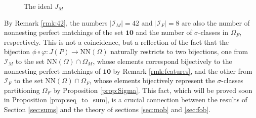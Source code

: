 \documentclass[10pt,a4paper]{amsart}
\numberwithin{equation}{section}
\newcommand{\ra}{\rightarrow}
\newcommand{\cali}{\mathcal{I}}
\newcommand{\ten}{\mathbf{10}}
\newcommand{\ob}{\Omega}
\newcommand{\fob}{\Omega_F}
\newcommand{\mob}{\Omega_M}
\newcommand{\nn}{\mathrm{NN}}
\newcommand{\abs}[1]{\lvert #1 \rvert}
\begin{document}
\begin{figure}[h!]
    \caption{The ideal $J_M$}
    \label{fig:a4}
\end{figure}

By Remark \ref{rmk:42}, the numbers $\abs{\cali_M}=42$ and $\abs{\cali_F}=8$ are
also the number of nonnesting perfect matchings of the set $\ten$ and the number
of $\sigma$-classes in $\fob$, respectively. This is not a coincidence, but a
reflection of the fact that the bijection $\phi\circ\varphi: J(P)\ra \nn(\ob)$
naturally restricts to two bijections, one from $\cali_M$ to the set
$\nn(\ob)\cap \mob$, whose elements correspond bijectively to the nonnesting
perfect matchings of $\ten$ by Remark \ref{rmk:features}, and the other from
$\cali_F$ to the set $\nn(\ob)\cap \fob$, whose elements bijectively represent
the $\sigma$-classes partitioning $\fob$ by Proposition \ref{prop:Sigma}. This
fact, which will be proved soon in Proposition \ref{prop:seq_to_sum}, is a
crucial connection between the results of Section \ref{sec:sums} and the theory
of sections \ref{sec:mob} and \ref{sec:fob}. 
\end{document}

